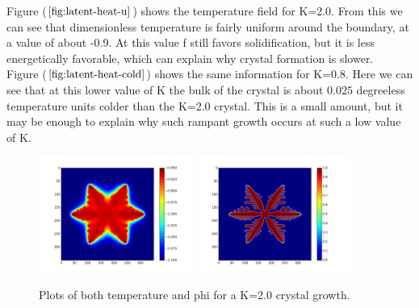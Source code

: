 \documentclass[10pt]{article} %
\begin{document}
Figure ($\ref{fig:latent-heat-u}$) shows the temperature field for K=2.0. From this we can see that dimensionless temperature is fairly uniform around the boundary, at a value of about -0.9. At this value f still favors solidification, but it is less energetically favorable, which can explain why crystal formation is slower. \\

Figure ($\ref{fig:latent-heat-cold}$) shows the same information for K=0.8. Here we can see that at this lower value of K the bulk of the crystal is about $0.025$ degreeless temperature units colder than the K=2.0 crystal. This is a small amount, but it may be enough to explain why such rampant growth occurs at such a low value of K.\\

\begin{figure}[h!]
  \centering
  \includegraphics[width=0.45\textwidth]{../u-field-6.png}
  \includegraphics[width=0.45\textwidth]{../phi-field-6.png}
  \caption{Plots of both temperature and phi for a K=2.0 crystal growth.}
  \label{fig:latent-heat}
\end{figure}
\end{document}
